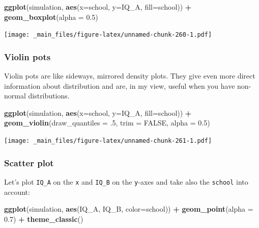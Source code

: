 \documentclass[
]{scrartcl}
\newenvironment{Shaded}{\begin{snugshade}}{\end{snugshade}}
\newcommand{\AttributeTok}[1]{\textcolor[rgb]{0.13,0.29,0.53}{#1}}
\newcommand{\ConstantTok}[1]{\textcolor[rgb]{0.56,0.35,0.01}{#1}}
\newcommand{\DecValTok}[1]{\textcolor[rgb]{0.00,0.00,0.81}{#1}}
\newcommand{\FloatTok}[1]{\textcolor[rgb]{0.00,0.00,0.81}{#1}}
\newcommand{\FunctionTok}[1]{\textcolor[rgb]{0.13,0.29,0.53}{\textbf{#1}}}
\newcommand{\NormalTok}[1]{#1}
\newcommand{\SpecialCharTok}[1]{\textcolor[rgb]{0.81,0.36,0.00}{\textbf{#1}}}
\begin{document}
\begin{Shaded}
\begin{Highlighting}[]
\FunctionTok{ggplot}\NormalTok{(simulation, }\FunctionTok{aes}\NormalTok{(}\AttributeTok{x=}\NormalTok{school, }\AttributeTok{y=}\NormalTok{IQ\_A, }\AttributeTok{fill=}\NormalTok{school)) }\SpecialCharTok{+}
  \FunctionTok{geom\_boxplot}\NormalTok{(}\AttributeTok{alpha =} \FloatTok{0.5}\NormalTok{)}
\end{Highlighting}
\end{Shaded}

\texttt{[image: \_main\_files/figure-latex/unnamed-chunk-260-1.pdf]}

\hypertarget{violin-pots}{%
\subsubsection{Violin pots}\label{violin-pots}}

Violin pots are like sideways, mirrored density plots. They give even more direct information about distribution and are, in my view, useful when you have non-normal distributions.

\begin{Shaded}
\begin{Highlighting}[]
\FunctionTok{ggplot}\NormalTok{(simulation, }\FunctionTok{aes}\NormalTok{(}\AttributeTok{x=}\NormalTok{school, }\AttributeTok{y=}\NormalTok{IQ\_A, }\AttributeTok{fill=}\NormalTok{school)) }\SpecialCharTok{+}
    \FunctionTok{geom\_violin}\NormalTok{(}\AttributeTok{draw\_quantiles =}\NormalTok{ .}\DecValTok{5}\NormalTok{, }\AttributeTok{trim =} \ConstantTok{FALSE}\NormalTok{, }\AttributeTok{alpha =} \FloatTok{0.5}\NormalTok{)}
\end{Highlighting}
\end{Shaded}

\texttt{[image: \_main\_files/figure-latex/unnamed-chunk-261-1.pdf]}

\hypertarget{scatter-plot}{%
\subsubsection{Scatter plot}\label{scatter-plot}}

Let's plot \texttt{IQ\_A} on the \texttt{x} and \texttt{IQ\_B} on the \texttt{y}-axes and take also the \texttt{school} into account:

\begin{Shaded}
\begin{Highlighting}[]
\FunctionTok{ggplot}\NormalTok{(simulation, }\FunctionTok{aes}\NormalTok{(IQ\_A, IQ\_B, }\AttributeTok{color=}\NormalTok{school)) }\SpecialCharTok{+}
  \FunctionTok{geom\_point}\NormalTok{(}\AttributeTok{alpha =} \FloatTok{0.7}\NormalTok{) }\SpecialCharTok{+}
  \FunctionTok{theme\_classic}\NormalTok{()}
\end{Highlighting}
\end{Shaded}
\end{document}
